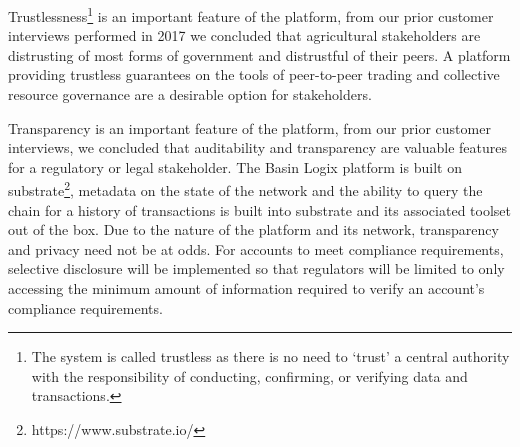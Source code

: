 \documentclass{tufte-handout}
\begin{document}
Trustlessness\footnote{The system is called trustless as there is no need to ‘trust’ a central authority with the responsibility of conducting, confirming, or verifying data and transactions.} is an important feature of the platform, from our prior customer interviews performed in 2017 we concluded that agricultural stakeholders are distrusting of most forms of government and distrustful of their peers. A platform providing trustless guarantees on the tools of peer-to-peer trading and collective resource governance are a desirable option for stakeholders. 

Transparency is an important feature of the platform, from our prior customer interviews, we concluded that auditability and transparency are valuable features for a regulatory or legal stakeholder. The Basin Logix platform is built on substrate\footnote{https://www.substrate.io/}, metadata on the state of the network and the ability to query the chain for a history of transactions is built into substrate and its associated toolset out of the box. Due to the nature of the platform and its network, transparency and privacy need not be at odds. For accounts to meet compliance requirements, selective disclosure will be implemented so that regulators will be limited to only accessing the minimum amount of information required to verify an account's compliance requirements.   
\end{document}
